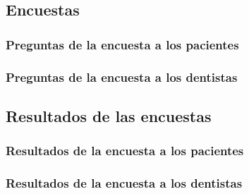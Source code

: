 \documentclass[letterpaper,12pt]{article}
\begin{document}
	\subsection{Encuestas}
		\subsubsection{Preguntas de la encuesta a los pacientes}
		\subsubsection{Preguntas de la encuesta a los dentistas}
	\subsection{Resultados de las encuestas}
		\subsubsection{Resultados de la encuesta a los pacientes}
		\subsubsection{Resultados de la encuesta a los dentistas}
\end{document}
